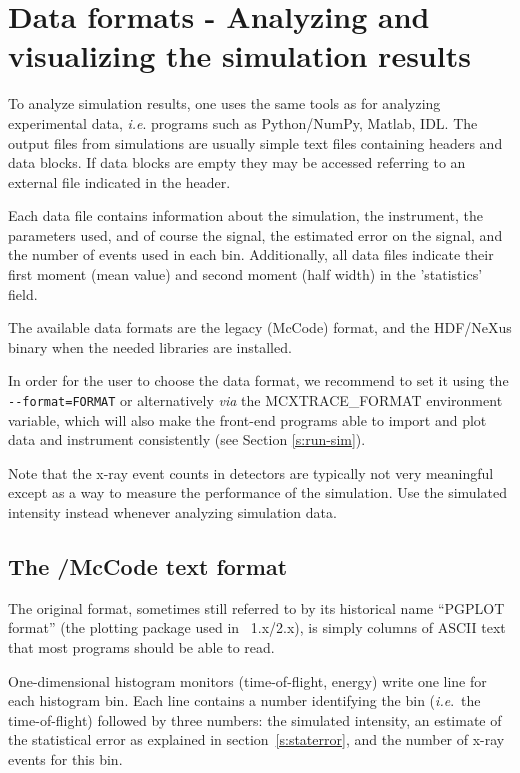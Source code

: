 \section{Data formats - Analyzing and visualizing the simulation results}
\label{s:analyze}

To analyze simulation results, one uses the same tools as for analyzing
experimental data, \textit{i.e}. programs such as Python/NumPy, Matlab, IDL.  The
output files from simulations are usually simple text files containing headers
and data blocks. If data blocks are empty they may be accessed referring to an
external file indicated in the header.

Each data file contains information about the simulation, the instrument, the
parameters used, and of course the signal, the estimated error on the signal,
and the number of events used in each bin. Additionally, all data files indicate
their first moment (mean value) and second moment (half width) in the
'statistics' field.

The available data formats are the legacy \MCX (McCode) format, and the HDF/NeXus binary when the needed libraries are installed.

In order for the user to choose the data format, we recommend to set it using
the \verb+--format=FORMAT+ or alternatively \textit{via} the MCXTRACE\_FORMAT
environment variable, which will also make the front-end programs able to import
and plot data and instrument consistently (see Section \ref{s:run-sim}). 

Note that the x-ray event counts in detectors are typically not very
meaningful except as a way to measure the performance of the
simulation. Use the simulated intensity instead whenever analyzing
simulation data.

\subsection{The \MCX/McCode text format}
The \MCX original format, sometimes still referred to by its historical name
``PGPLOT format'' (the plotting package used in \MCX~1.x/2.x), is simply
columns of ASCII text that most
programs should be able to read.

One-dimensional histogram monitors (time-of-flight, energy)
write one line for each histogram bin. Each line contains a number
identifying the bin (\textit{i.e}.\ the time-of-flight) followed by
three numbers: the simulated intensity, an estimate of the statistical
error as explained in section~\ref{s:staterror}, and the number of
x-ray events for this bin.

